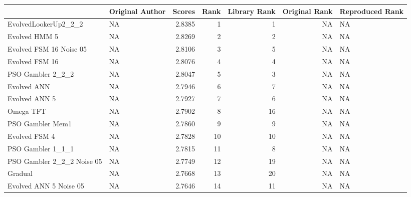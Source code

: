 \begin{tabular}{llrrrrl}
\toprule
{} &                     Original Author &  Scores &  Rank &  Library Rank &  Original Rank & Reproduced Rank \\
\midrule
EvolvedLookerUp2\_2\_2       &                                  NA &  2.8385 &     1 &             1 &             NA &              NA \\
Evolved HMM 5              &                                  NA &  2.8269 &     2 &             2 &             NA &              NA \\
Evolved FSM 16 Noise 05    &                                  NA &  2.8106 &     3 &             5 &             NA &              NA \\
Evolved FSM 16             &                                  NA &  2.8076 &     4 &             4 &             NA &              NA \\
PSO Gambler 2\_2\_2          &                                  NA &  2.8047 &     5 &             3 &             NA &              NA \\
Evolved ANN                &                                  NA &  2.7946 &     6 &             7 &             NA &              NA \\
Evolved ANN 5              &                                  NA &  2.7927 &     7 &             6 &             NA &              NA \\
Omega TFT                  &                                  NA &  2.7902 &     8 &            16 &             NA &              NA \\
PSO Gambler Mem1           &                                  NA &  2.7860 &     9 &             9 &             NA &              NA \\
Evolved FSM 4              &                                  NA &  2.7828 &    10 &            10 &             NA &              NA \\
PSO Gambler 1\_1\_1          &                                  NA &  2.7815 &    11 &             8 &             NA &              NA \\
PSO Gambler 2\_2\_2 Noise 05 &                                  NA &  2.7749 &    12 &            19 &             NA &              NA \\
Gradual                    &                                  NA &  2.7668 &    13 &            20 &             NA &              NA \\
Evolved ANN 5 Noise 05     &                                  NA &  2.7646 &    14 &            11 &             NA &              NA \\

\end{tabular}
